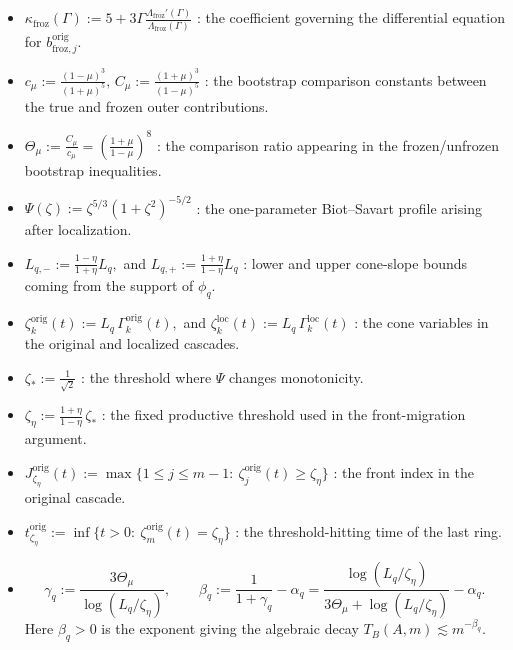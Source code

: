 \documentclass[reqno,11pt]{amsart}
\begin{document}
\begin{itemize}
\begin{itemize}
    \item$
        \kappa_{\mathrm{froz}}(\Gamma):=5+3\Gamma\frac{\Lambda_{\mathrm{froz}}'(\Gamma)}{\Lambda_{\mathrm{froz}}(\Gamma)}
    $
    : the coefficient governing the differential equation for $b_{\mathrm{froz},j}^{\mathrm{orig}}$.

    \item
    $
        c_\mu:=\frac{(1-\mu)^3}{(1+\mu)^5},
        \, 
        C_\mu:=\frac{(1+\mu)^3}{(1-\mu)^5}
    $
    : the bootstrap comparison constants between the true and frozen outer contributions.

    \item
    $
        \Theta_\mu:=\frac{C_\mu}{c_\mu}
        =\left(\frac{1+\mu}{1-\mu}\right)^8
    $
    : the comparison ratio appearing in the frozen/unfrozen bootstrap inequalities.

    \item
    $
        \Psi(\zeta):=\zeta^{5/3}(1+\zeta^2)^{-5/2}
    $
    : the one-parameter Biot--Savart profile arising after localization.

    \item
    $
        L_{q,-}:=\frac{1-\eta}{1+\eta}L_q,$ and $
        L_{q,+}:=\frac{1+\eta}{1-\eta}L_q
    $
    : lower and upper cone-slope bounds coming from the support of $\phi_q$.

    \item
    $
        \zeta_k^{\mathrm{orig}}(t):=L_q\,\Gamma_k^{\mathrm{orig}}(t),$ and $
        \zeta_k^{\mathrm{loc}}(t):=L_q\,\Gamma_k^{\mathrm{loc}}(t)
    $
    : the cone variables in the original and localized cascades.

    \item
    $
        \zeta_*:=\frac{1}{\sqrt2}
    $
    : the threshold where $\Psi$ changes monotonicity.

    \item
    $
        \zeta_\eta:=\frac{1+\eta}{1-\eta}\,\zeta_*$
    : the fixed productive threshold used in the front-migration argument.

    \item
    $
        J_{\zeta_\eta}^{\mathrm{orig}}(t)
        :=\max\Big\{1\le j\le m-1:\ \zeta_j^{\mathrm{orig}}(t)\ge \zeta_\eta\Big\}$
    : the front index in the original cascade.

    \item
    $
        t_{\zeta_\eta}^{\mathrm{orig}}
        :=\inf\Big\{t>0:\ \zeta_m^{\mathrm{orig}}(t)=\zeta_\eta\Big\}$
    : the threshold-hitting time of the last ring.
    \item
\[
\gamma_q:=\frac{3\Theta_\mu}{\log(L_q/\zeta_\eta)},
\qquad
\beta_q:=\frac{1}{1+\gamma_q}-\alpha_q
=
\frac{\log(L_q/\zeta_\eta)}
{3\Theta_\mu+\log(L_q/\zeta_\eta)}
-\alpha_q.
\]
Here $\beta_q>0$ is the exponent giving the algebraic decay
$T_B(A,m)\lesssim m^{-\beta_q}$.
\end{itemize}



\end{itemize}
\end{document}
